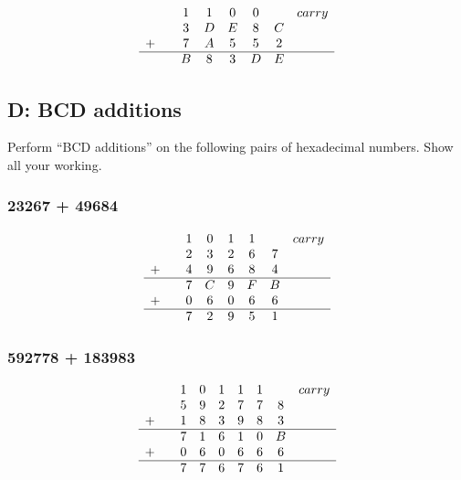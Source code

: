 \documentclass[12pt,a4paper]{article}
\begin{document}
\begin{equation*}
\centering
\begin{array}{c c c c c c c c}
  &   & 1 & 1 & 0 & 0 &   & carry \\
  &   & 3 & D & E & 8 & C &       \\
+ &   & 7 & A & 5 & 5 & 2 &       \\ \hline
  &   & B & 8 & 3 & D & E &
\end{array}
\end{equation*}

\newpage
\subsection{D: BCD additions}

Perform ``BCD additions'' on the following pairs of hexadecimal numbers. Show all your working.

\subsubsection{23267 + 49684}

\begin{equation*}
\centering
\begin{array}{c c c c c c c c}
  &   & 1 & 0 & 1 & 1 &   & carry \\
  &   & 2 & 3 & 2 & 6 & 7 &       \\
+ &   & 4 & 9 & 6 & 8 & 4 &       \\ \hline
  &   & 7 & C & 9 & F & B &       \\
+ &   & 0 & 6 & 0 & 6 & 6 &       \\ \hline
  &   & 7 & 2 & 9 & 5 & 1 &
\end{array}
\end{equation*}

\subsubsection{592778 + 183983}

\begin{equation*}
\centering
\begin{array}{c c c c c c c c c}
  &   & 1 & 0 & 1 & 1 & 1 &   & carry \\
  &   & 5 & 9 & 2 & 7 & 7 & 8 &       \\
+ &   & 1 & 8 & 3 & 9 & 8 & 3 &       \\ \hline
  &   & 7 & 1 & 6 & 1 & 0 & B &       \\
+ &   & 0 & 6 & 0 & 6 & 6 & 6 &       \\ \hline
  &   & 7 & 7 & 6 & 7 & 6 & 1 &       \\
\end{array}
\end{equation*}
\end{document}
